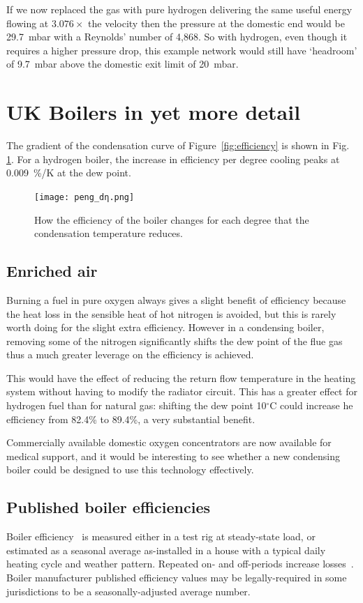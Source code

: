 \documentclass[5p]{elsarticle} %
\begin{document}
If we now replaced the gas with pure hydrogen  delivering the same useful energy flowing at $3.076\times$ the velocity then the pressure at the domestic end would be 29.7~mbar with a Reynolds' number of 4,868.
So with hydrogen, even though it requires a higher pressure drop, this example network would still have `headroom' of 9.7~mbar above the domestic exit limit of 20~mbar.

\section{UK Boilers in yet more detail}
\label{appendix:yetmore-boilers}

The gradient of the condensation curve of Figure~\ref{fig:efficiency} is shown in Fig. \ref{fig:gradient}. For a hydrogen boiler, the increase in efficiency per degree cooling peaks at 0.009~\%/K at the dew point.


\begin{figure}[htb]
\centering
\texttt{[image: peng\_dη.png]}
\caption{How the efficiency of the boiler changes for each degree that the condensation temperature reduces.}
\label{fig:gradient}
\end{figure}

\subsection{Enriched air}
Burning a fuel in pure oxygen always gives a slight benefit of efficiency because the heat loss in the sensible heat of hot nitrogen is avoided, but this is rarely worth doing for the slight extra efficiency. However in a condensing boiler, removing some of the nitrogen significantly shifts the dew point of the flue gas thus a much greater leverage on the efficiency is achieved.

This would have the effect of reducing the  return flow temperature in the heating system without having to modify the radiator circuit. This has a greater effect for hydrogen fuel than for natural gas: shifting the dew point 10$^\circ$C could increase he efficiency from 82.4\% to 89.4\%, a very substantial benefit.

Commercially available domestic oxygen concentrators are now available for medical support, and it would be interesting to see whether a new condensing boiler could be designed to use this technology effectively.

\subsection{Published boiler efficiencies}
Boiler efficiency~\citep{Bennet2017} is  measured either in a test rig at steady-state load, or estimated as a seasonal average as-installed in a house with a typical daily heating cycle and weather pattern. Repeated on- and off-periods increase losses~\citep{saty2018}. Boiler manufacturer published efficiency values may be legally-required in some jurisdictions to be a seasonally-adjusted average number.
\end{document}
